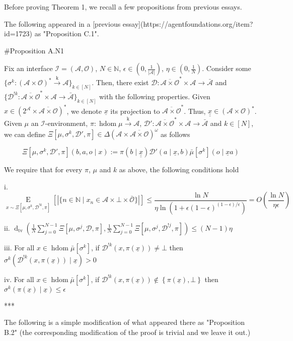 \documentclass[a4paper]{article}
\newcommand{\AC}[1]{\left\{#1\right\}}
\newcommand{\E}[1]{\underset{#1}{\operatorname{E}}}
\newcommand{\Dtv}{\operatorname{d}_{\text{tv}}}
\newcommand{\Nats}{\mathbb{N}}
\newcommand{\Abs}[1]{\left\vert #1 \right\vert}
\newcommand{\M}{\xrightarrow{\text{k}}}
\newcommand{\Ob}{\mathcal{O}}
\newcommand{\A}{\mathcal{A}}
\newcommand{\In}{\mathcal{I}}
\newcommand{\FH}{(\A \times \Ob)^*}
\newcommand{\Ada}{\bar{\A}}
\newcommand{\Adao}{\overline{\A \times \Ob}}
\newcommand{\Adfh}{\Adao^*}
\DeclareMathOperator{\HD}{hdom}
\newcommand{\Dl}{\mathcal{D}}
\begin{document}
Before proving Theorem 1, we recall a few propositions from previous essays.

The following appeared in a [previous essay](https://agentfoundations.org/item?id=1723) as "Proposition C.1".

\#Proposition A.N1

Fix an interface $\In=(\A,\Ob)$, $N \in \Nats$, $\epsilon \in (0,\frac{1}{\Abs{\A}})$, $\eta \in (0,\frac{1}{N})$. Consider some $\{\sigma^k: \FH \M \A\}_{k \in [N]}$. Then, there exist $\Dl: \Adfh \times \A \rightarrow \Ada$ and $\{\Dl^{!k}: \Adfh \times \A \rightarrow \Ada\}_{k \in [N]}$ with the following properties. Given $x \in \left(2^\A \times \Adao\right)^*$, we denote $\underline{x}$ its projection to $\Adfh$. Thus, $\underline{\underline{x}}\in\FH$.
Given  $\mu$ an $\In$-environment, $\pi: \HD{\mu} \M \A$, $\Dl': \Adfh \times \A \rightarrow \Ada$ and $k \in [N]$, we can define $\Xi\left[\mu,\sigma^k,\Dl',\pi\right]\in \Delta\left(\A \times \Adao\right)^\omega$ as follows
 
$$\Xi\left[\mu,\sigma^k,\Dl',\pi\right]\left(b,a,o \mid x\right):=\pi\left(b \mid \underline{\underline{x}}\right)\Dl'\left(a \mid \underline{x},b\right) \bar{\mu}[\sigma^k]\left(o \mid \underline{x}a\right)$$

We require that for every $\pi$, $\mu$ and $k$ as above, the following conditions hold

i. $$\E{x \sim\Xi\left[\mu,\sigma^k,\Dl^{!k},\pi\right]}\left[\Abs{\{n \in \Nats \mid x_n \in \A \times \bot \times \bar{\Ob}\}}\right] \leq \frac{\ln N}{\eta \ln\left(1 + \epsilon(1-\epsilon)^{(1-\epsilon)/\epsilon}\right)}=O\left(\frac{\ln N}{\eta \epsilon}\right)$$

ii. $\Dtv\left(\frac{1}{N}\sum_{j=0}^{N-1}{\Xi\left[\mu,\sigma^j,\Dl,\pi\right]},\frac{1}{N}\sum_{j=0}^{N-1}{\Xi\left[\mu,\sigma^j,\Dl^{!j},\pi\right]}\right) \leq (N-1)\eta$

iii. For all $x \in \HD{\bar{\mu}[\sigma^k]}$, if $\Dl^{!k}\left(x,\pi\left(\underline{x}\right)\right) \ne \bot$ then $\sigma^k\left(\Dl^{!k}\left(x,\pi\left(\underline{x}\right)\right) \mid \underline{x}\right) > 0$

iv. For all $x \in \HD{\bar{\mu}[\sigma^k]}$, if $\Dl^{!k}\left(x,\pi\left(\underline{x}\right)\right) \not\in \AC{\pi\left(\underline{x}\right), \bot}$ then $\sigma^k\left(\pi\left(\underline{x}\right) \mid \underline{x}\right) \leq \epsilon$

***

The following is a simple modification of what appeared there as "Proposition B.2" (the corresponding modification of the proof is trivial and we leave it out.)
\end{document}
